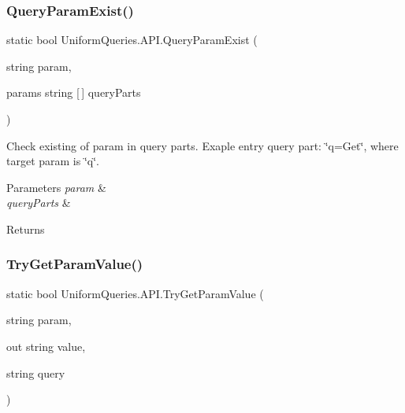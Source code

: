 \subsubsection{\texorpdfstring{Query\+Param\+Exist()}{QueryParamExist()}\hspace{0.1cm}{\footnotesize\ttfamily [2/2]}}
{\footnotesize\ttfamily static bool Uniform\+Queries.\+A\+P\+I.\+Query\+Param\+Exist (\begin{DoxyParamCaption}\item[{string}]{param,  }\item[{params string \mbox{[}$\,$\mbox{]}}]{query\+Parts }\end{DoxyParamCaption})\hspace{0.3cm}{\ttfamily [static]}}



Check existing of param in query parts. Exaple entry query part\+: \char`\"{}q=\+Get\char`\"{}, where target param is \char`\"{}q\char`\"{}. 


\begin{DoxyParams}{Parameters}
{\em param} & \\
\hline
{\em query\+Parts} & \\
\hline
\end{DoxyParams}
\begin{DoxyReturn}{Returns}

\end{DoxyReturn}
\mbox{\label{class_uniform_queries_1_1_a_p_i_a987eb23a48b90e542001cc12fcbc1ddc}} 
\subsubsection{\texorpdfstring{Try\+Get\+Param\+Value()}{TryGetParamValue()}\hspace{0.1cm}{\footnotesize\ttfamily [1/2]}}
{\footnotesize\ttfamily static bool Uniform\+Queries.\+A\+P\+I.\+Try\+Get\+Param\+Value (\begin{DoxyParamCaption}\item[{string}]{param,  }\item[{out string}]{value,  }\item[{string}]{query }\end{DoxyParamCaption})\hspace{0.3cm}{\ttfamily [static]}}




